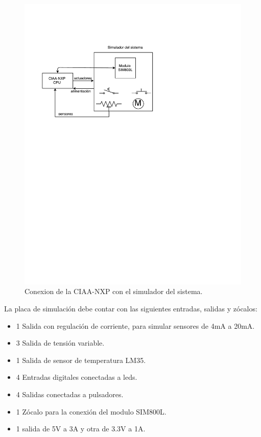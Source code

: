 \begin{figure}[!htb]
  \centering
  \includegraphics[page=1,scale=1,clip,trim=1.5cm 16.5cm 5.5cm 3.5cm]{./Figures/ciaa_placa_base.pdf}
  \caption{Conexion de la CIAA-NXP con el simulador del sistema.}
  \label{fig:diagrama_simulado}
\end{figure}


La placa de simulación debe contar con las siguientes entradas, salidas y zócalos:

\begin{itemize}
  \item 1 Salida con regulación de corriente, para simular sensores de 4mA a 20mA.
  \item 3 Salida de tensión variable.
  \item 1 Salida de sensor de temperatura LM35.
  \item 4 Entradas digitales conectadas a leds.
  \item 4 Salidas conectadas a pulsadores. 
  \item 1 Zócalo para la conexión del modulo SIM800L. 
  \item 1 salida de 5V a 3A y otra de 3.3V a 1A. 
\end{itemize}

